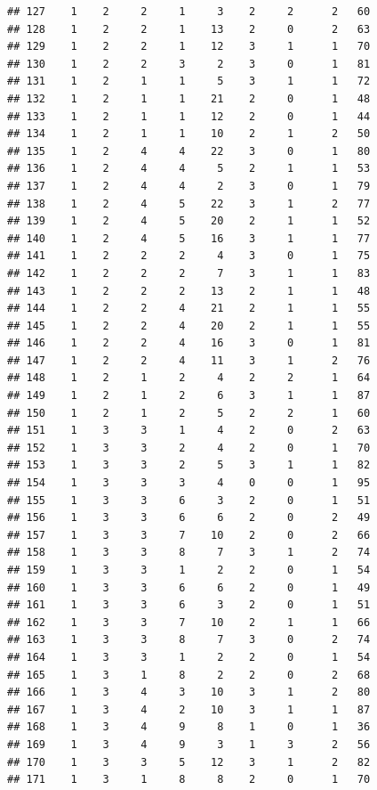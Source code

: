 \documentclass[krantz2,ChapterTOCs]{krantz}\usepackage{knitr}
\begin{document}
\begin{knitrout}
\begin{kframe}
\begin{verbatim}
## 127    1    2     2     1     3    2     2      2   60
## 128    1    2     2     1    13    2     0      2   63
## 129    1    2     2     1    12    3     1      1   70
## 130    1    2     2     3     2    3     0      1   81
## 131    1    2     1     1     5    3     1      1   72
## 132    1    2     1     1    21    2     0      1   48
## 133    1    2     1     1    12    2     0      1   44
## 134    1    2     1     1    10    2     1      2   50
## 135    1    2     4     4    22    3     0      1   80
## 136    1    2     4     4     5    2     1      1   53
## 137    1    2     4     4     2    3     0      1   79
## 138    1    2     4     5    22    3     1      2   77
## 139    1    2     4     5    20    2     1      1   52
## 140    1    2     4     5    16    3     1      1   77
## 141    1    2     2     2     4    3     0      1   75
## 142    1    2     2     2     7    3     1      1   83
## 143    1    2     2     2    13    2     1      1   48
## 144    1    2     2     4    21    2     1      1   55
## 145    1    2     2     4    20    2     1      1   55
## 146    1    2     2     4    16    3     0      1   81
## 147    1    2     2     4    11    3     1      2   76
## 148    1    2     1     2     4    2     2      1   64
## 149    1    2     1     2     6    3     1      1   87
## 150    1    2     1     2     5    2     2      1   60
## 151    1    3     3     1     4    2     0      2   63
## 152    1    3     3     2     4    2     0      1   70
## 153    1    3     3     2     5    3     1      1   82
## 154    1    3     3     3     4    0     0      1   95
## 155    1    3     3     6     3    2     0      1   51
## 156    1    3     3     6     6    2     0      2   49
## 157    1    3     3     7    10    2     0      2   66
## 158    1    3     3     8     7    3     1      2   74
## 159    1    3     3     1     2    2     0      1   54
## 160    1    3     3     6     6    2     0      1   49
## 161    1    3     3     6     3    2     0      1   51
## 162    1    3     3     7    10    2     1      1   66
## 163    1    3     3     8     7    3     0      2   74
## 164    1    3     3     1     2    2     0      1   54
## 165    1    3     1     8     2    2     0      2   68
## 166    1    3     4     3    10    3     1      2   80
## 167    1    3     4     2    10    3     1      1   87
## 168    1    3     4     9     8    1     0      1   36
## 169    1    3     4     9     3    1     3      2   56
## 170    1    3     3     5    12    3     1      2   82
## 171    1    3     1     8     8    2     0      1   70

\end{verbatim}
\end{kframe}
\end{knitrout}
\end{document}
